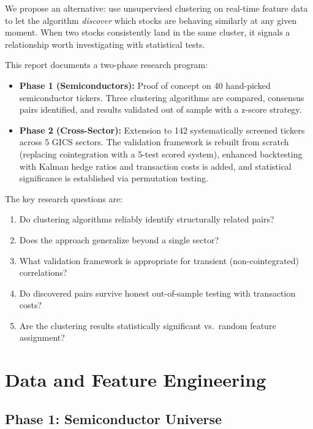 \documentclass[11pt, a4paper]{article}
\begin{document}
We propose an alternative: use unsupervised clustering on real-time feature data to let the algorithm \textit{discover} which stocks are behaving similarly at any given moment. When two stocks consistently land in the same cluster, it signals a relationship worth investigating with statistical tests.

This report documents a two-phase research program:

\begin{itemize}
    \item \textbf{Phase 1 (Semiconductors):} Proof of concept on 40 hand-picked semiconductor tickers. Three clustering algorithms are compared, consensus pairs identified, and results validated out of sample with a z-score strategy.
    \item \textbf{Phase 2 (Cross-Sector):} Extension to 142 systematically screened tickers across 5 GICS sectors. The validation framework is rebuilt from scratch (replacing cointegration with a 5-test scored system), enhanced backtesting with Kalman hedge ratios and transaction costs is added, and statistical significance is established via permutation testing.
\end{itemize}

The key research questions are:

\begin{enumerate}
    \item Do clustering algorithms reliably identify structurally related pairs?
    \item Does the approach generalize beyond a single sector?
    \item What validation framework is appropriate for transient (non-cointegrated) correlations?
    \item Do discovered pairs survive honest out-of-sample testing with transaction costs?
    \item Are the clustering results statistically significant vs.\ random feature assignment?
\end{enumerate}

\section{Data and Feature Engineering}

\subsection{Phase 1: Semiconductor Universe}
\end{document}
